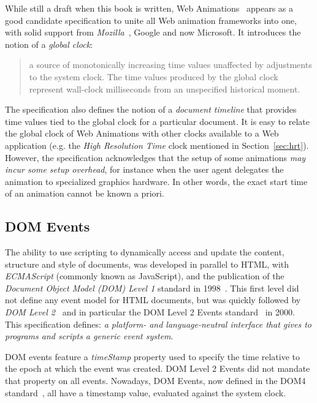 While still a draft when this book is written, Web Animations~\cite{webanimation} appears as
a good candidate specification to unite all Web animation frameworks into one,
with solid support from \emph{Mozilla}~\cite{mozilla}, Google and now Microsoft. It introduces the
notion of a \emph{global clock}:
\begin{quote} a source of monotonically increasing time values unaffected by
adjustments to the system clock. The time values produced by the global clock
represent wall-clock milliseconds from an unspecified historical moment.
\end{quote}
The specification also defines the notion of a \emph{document timeline}
that provides time values tied to the global clock for a particular document.
It is easy to relate the global clock of Web Animations with other clocks
available to a Web application (e.g. the \emph{High Resolution Time} clock mentioned
in Section~\ref{sec:hrt}). However, the specification acknowledges that the setup of some
animations \emph{may incur some setup overhead}, for instance when the user agent
delegates the animation to specialized graphics hardware. In other words, the
exact start time of an animation cannot be known a priori.



\subsection{DOM Events}
\label{sec:domevents}

The ability to use scripting to dynamically access and update the content,
structure and style of documents, was developed in parallel to HTML, with
\emph{ECMAScript} (commonly known as JavaScript), and the publication of the
\emph{Document Object Model (DOM) Level 1} standard in 1998~\cite{dom1}. This
first level did not define any event model for HTML documents, but was quickly
followed by \emph{DOM Level 2}~\cite{dom2} and in particular the DOM Level 2
Events standard~\cite{domevents} in 2000. This specification defines: \emph{a
platform- and language-neutral interface that gives to programs and scripts a
generic event system}.

DOM events feature a \emph{timeStamp} property used to specify the time relative to
the epoch at which the event was created. DOM Level 2 Events did not mandate
that property on all events. Nowadays, DOM Events, now defined in the DOM4
standard~\cite{dom4}, all have a timestamp value, evaluated against the system
clock.

